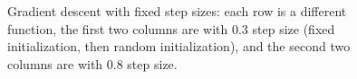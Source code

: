 \begin{figure}[h!tbp]
       \caption{Gradient descent with fixed step sizes: each row is a different
       function, the first two columns are with $0.3$ step size (fixed initialization,
       then random initialization), and the second two columns are with $0.8$ step size.}
\end{figure}

